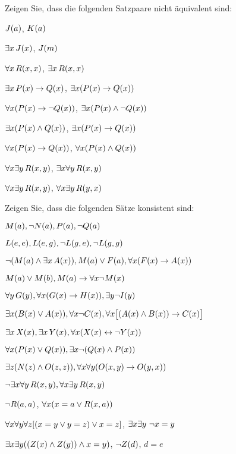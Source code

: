 \solutions
\problempart
\label{pr.NotEquiv}
Zeigen Sie, dass die folgenden Satzpaare nicht äquivalent sind:
\begin{earg}
\item $\mathord{J}(a) $,  $\mathord{K}(a)$
\item $\exists x\, \mathord{J}(x)$,  $\mathord{J}(m)$
\item $\forall x\, \mathord{R}(x,x)$, $\exists x\, \mathord{R}(x,x)$
\item $\exists x\, \mathord{P}(x) \rightarrow \mathord{Q}(x)$, $\exists x (\mathord{P}(x) \rightarrow \mathord{Q}(x))$
\item $\forall x(\mathord{P}(x) \rightarrow \neg \mathord{Q}(x))$, $\exists x(\mathord{P}(x) \wedge \neg \mathord{Q}(x))$
\item $\exists x(\mathord{P}(x) \wedge \mathord{Q}(x))$, $\exists x(\mathord{P}(x) \rightarrow \mathord{Q}(x))$
\item $\forall x(\mathord{P}(x)\rightarrow \mathord{Q}(x))$, $\forall x(\mathord{P}(x) \wedge \mathord{Q}(x))$
\item $\forall x\exists y\, \mathord{R}(x,y)$, $\exists x\forall y\, \mathord{R}(x,y)$
\item $\forall x\exists y\, \mathord{R}(x,y)$, $\forall x\exists y\, \mathord{R}(y,x)$
\end{earg}



\problempart
Zeigen Sie, dass die folgenden Sätze konsistent sind:
\begin{earg}
\item  $\mathord{M}(a), \neg \mathord{N}(a), \mathord{P}(a), \neg \mathord{Q}(a)$
\item $\mathord{L}(e,e), \mathord{L}(e,g), \neg \mathord{L}(g,e), \neg \mathord{L}(g,g)$
\item $\neg (\mathord{M}(a) \wedge \exists x\, \mathord{A}(x)), \mathord{M}(a) \vee \mathord{F}(a), \forall x(\mathord{F}(x) \rightarrow \mathord{A}(x))$
\item $\mathord{M}(a) \vee \mathord{M}(b), \mathord{M}(a) \rightarrow \forall x \neg \mathord{M}(x)$
\item $\forall y\, \mathord{G}(y), \forall x (\mathord{G}(x) \rightarrow \mathord{H}(x)), \exists y \neg \mathord{I}(y)$
\item $\exists x(\mathord{B}(x) \vee \mathord{A}(x)), \forall x \neg \mathord{C}(x), \forall x\bigl[(\mathord{A}(x) \wedge \mathord{B}(x)) \rightarrow \mathord{C}(x)\bigr]$
\item $\exists x\, \mathord{X}(x), \exists x\, \mathord{Y}(x), \forall x(\mathord{X}(x) \leftrightarrow \neg \mathord{Y}(x))$
\item $\forall x(\mathord{P}(x) \vee \mathord{Q}(x)), \exists x\neg(\mathord{Q}(x) \wedge \mathord{P}(x))$
\item $\exists z(\mathord{N}(z) \wedge \mathord{O}(z,z)), \forall x\forall y(\mathord{O}(x,y) \rightarrow \mathord{O}(y,x))$
\item $\neg \exists x \forall y\, \mathord{R}(x,y), \forall x \exists y\, \mathord{R}(x,y)$
\item $\neg \mathord{R}(a,a)$, $\forall x (x=a \vee \mathord{R}(x,a))$
\item $\forall x\forall y\forall z[(x=y \vee y=z )\vee x=z]$, $\exists x\exists y\ \neg x= y$
\item $\exists x\exists y((\mathord{Z}(x) \wedge \mathord{Z}(y) )\wedge x=y)$, $\neg \mathord{Z}(d)$, $d=e$
\end{earg}

